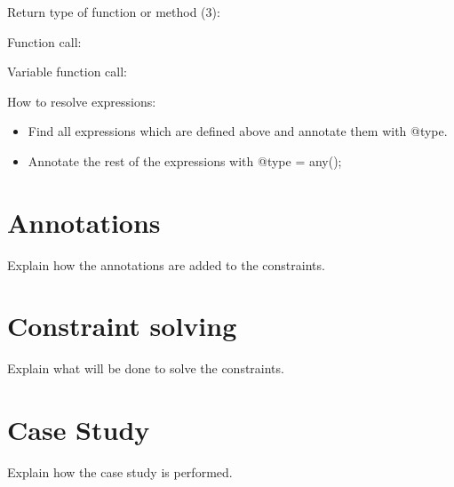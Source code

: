 \documentclass[../main.tex]{subfiles}
\begin{document}
    Return type of function or method (3):    
    \begin{prooftree}
    \end{prooftree}    
    
    \hrulefill
        
    Function call:
    \begin{prooftree}
    \end{prooftree}    
    
    \hrulefill
    
    Variable function call:
    \begin{prooftree}
    \end{prooftree}    
    
    \hrulefill
    
    How to resolve expressions:
    \begin{itemize}
        \item Find all expressions which are defined above and annotate them with @type.
        \item Annotate the rest of the expressions with @type = any();
    \end{itemize}

       
    
    \section{Annotations}
    Explain how the annotations are added to the constraints.
    \Blindtext
    
    \section{Constraint solving}
    Explain what will be done to solve the constraints.
    \\
    \Blindtext
    
    \section{Case Study}
    Explain how the case study is performed.
    \\
    \Blindtext
\end{document}
